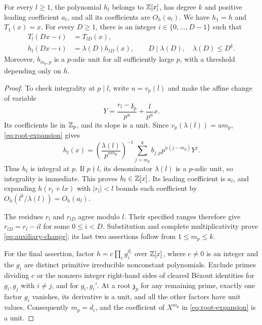 \begin{lemma}\label{lem:auxiliary}
For every $l\ge1$, the polynomial $h_l$ belongs to $\mathbb Z[x]$, has
degree $k$ and positive leading coefficient $a_l$, and all its coefficients
are $O_h(a_l)$.  We have $h_1=h$ and $T_1(x)=x$.
For every $D\ge1$, there is an integer $i\in\{0,\ldots,D-1\}$ such that
\begin{equation}\label{eq:auxiliary-change}
 \begin{split}
 T_l(Dx-i)&=T_{lD}(x),\\
 h_l(Dx-i)&=\lambda(D)h_{lD}(x),\qquad
 D\mid\lambda(D),\quad \lambda(D)\le D^k.
 \end{split}
\end{equation}
Moreover, $b_{m_p,p}$ is a $p$-adic unit for all sufficiently large $p$,
with a threshold depending only on $h$.
\end{lemma}

\begin{proof}
To check integrality at $p\mid l$, write $u=v_p(l)$ and make the affine
change of variable
\[
 Y=\frac{r_l-\mathfrak z_p}{p^u}+\frac{l}{p^u}x.
\]
Its coefficients lie in $\mathbb Z_p$, and its slope is a unit.  Since
$v_p(\lambda(l))=um_p$, \eqref{eq:root-expansion} gives
\begin{equation}\label{eq:auxiliary-padic}
 h_l(x)=
 \left(\frac{\lambda(l)}{p^{um_p}}\right)^{-1}
 \sum_{j=m_p}^k b_{j,p}p^{u(j-m_p)}Y^j.
\end{equation}
Thus $h_l$ is integral at $p$.  If $p\nmid l$, its denominator
$\lambda(l)$ is a $p$-adic unit, so integrality is immediate.  This proves
$h_l\in\mathbb Z[x]$.  Its leading coefficient is $a_l$, and expanding
$h(r_l+lx)$ with $|r_l|<l$ bounds each coefficient by
$O_h(l^k/\lambda(l))=O_h(a_l)$.

The residues $r_l$ and $r_{lD}$ agree modulo $l$.  Their specified ranges
therefore give $r_{lD}=r_l-il$ for some $0\le i<D$.  Substitution and
complete multiplicativity prove \eqref{eq:auxiliary-change}; its last two
assertions follow from $1\le m_p\le k$.

For the final assertion, factor
$h=c\prod_i g_i^{d_i}$ over $\mathbb Z[x]$, where $c\ne0$ is an integer
and the $g_i$ are distinct primitive irreducible nonconstant polynomials.
Exclude primes dividing $c$ or the nonzero integer right-hand sides of
cleared B\'ezout identities for $g_i,g_j$ with $i\ne j$, and for
$g_i,g_i'$.  At a root $\mathfrak z_p$ for any remaining prime, exactly one
factor $g_i$ vanishes, its derivative is a unit, and all the other factors
have unit values.  Consequently $m_p=d_i$, and the coefficient of
$X^{m_p}$ in \eqref{eq:root-expansion} is a unit.
\end{proof}

